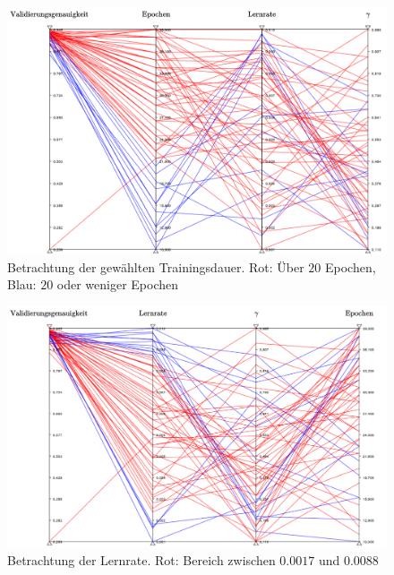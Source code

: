 \begin{figure}[h]
\includegraphics[scale=0.6]{NNOPT/attention_epochs.pdf}
\caption{Betrachtung der gewählten Trainingsdauer. Rot: Über $20$ Epochen, Blau: $20$ oder weniger Epochen}
\label{attention_epochs}
\end{figure}
\begin{figure}[h]
\includegraphics[scale=0.6]{NNOPT/attention_lr.pdf}
\caption{Betrachtung der Lernrate. Rot: Bereich zwischen $0.0017$ und $0.0088$}
\label{attention_lr}
\end{figure}


